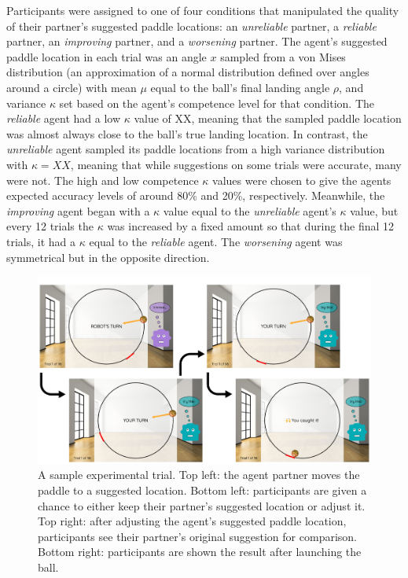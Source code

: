 \documentclass[10pt,letterpaper]{article}
\begin{document}

Participants were assigned to one of four conditions that manipulated the quality of their partner's suggested paddle locations: an \textit{unreliable} partner, a \textit{reliable} partner, an \textit{improving} partner, and a \textit{worsening} partner. The agent's
suggested paddle location in each trial was an angle $x$ sampled from a von Mises distribution (an approximation of a normal distribution defined over angles around a circle) with mean $\mu$ equal to the ball's final landing angle $\rho$, and variance $\kappa$ set based on the agent's competence level for that condition. The \textit{reliable} agent had a low $\kappa$ value of XX, meaning that the sampled paddle location was almost always close to the ball's true landing location. In contrast, the \textit{unreliable} agent sampled its paddle locations from a high variance distribution with $\kappa = XX$, meaning that while suggestions on some trials were accurate, many were not. The high and low competence $\kappa$ values were chosen to give the agents expected accuracy levels of around 80\% and 20\%, respectively. Meanwhile, the \textit{improving} agent began with a $\kappa$ value equal to the \textit{unreliable} agent's $\kappa$ value, but every 12 trials the $\kappa$ was increased by a fixed amount so that during the final 12 trials, it had a $\kappa$ equal to the \textit{reliable} agent. The \textit{worsening} agent was symmetrical but in the opposite direction.


\begin{figure}[H]
\begin{center}
\includegraphics[width=\linewidth]{img/stimulus_overview.png}
\end{center}
\caption{A sample experimental trial. Top left: the agent partner moves the paddle to a suggested location. Bottom left: participants are given a chance to either keep their partner's suggested location or adjust it. Top right: after adjusting the agent's suggested paddle location, participants see their partner's original suggestion for comparison. Bottom right: participants are shown the result after launching the ball.} 
\label{fig:stim}
\end{figure}
\end{document}
